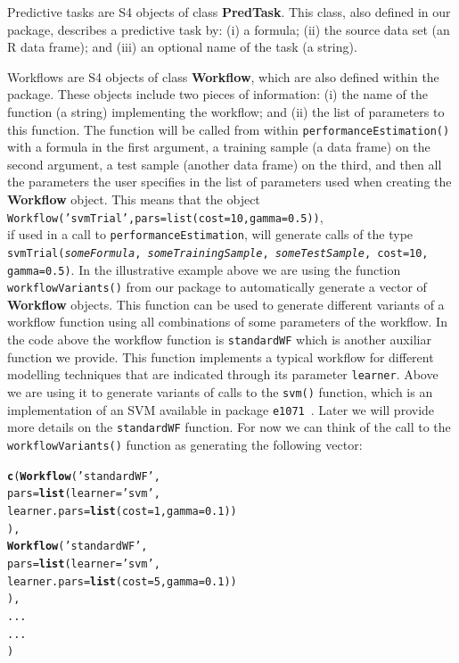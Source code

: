 \documentclass[10pt,a4paper]{article}\usepackage[]{graphicx}\usepackage[]{color}
\makeatletter
\newcommand{\hlstr}[1]{\textcolor[rgb]{0.192,0.494,0.8}{#1}}%
\newcommand{\hlkwd}[1]{\textcolor[rgb]{0.737,0.353,0.396}{\textbf{#1}}}%
\newenvironment{kframe}{%
 \def\at@end@of@kframe{}%
 \ifinner\ifhmode%
  \def\at@end@of@kframe{\end{minipage}}%
  \begin{minipage}{\columnwidth}%
 \fi\fi%
 \def\FrameCommand##1{\hskip\@totalleftmargin \hskip-\fboxsep
 \colorbox{shadecolor}{##1}\hskip-\fboxsep
     \hskip-\linewidth \hskip-\@totalleftmargin \hskip\columnwidth}%
 \MakeFramed {\advance\hsize-\width
   \@totalleftmargin\z@ \linewidth\hsize
   \@setminipage}}%
 {\par\unskip\endMakeFramed%
 \at@end@of@kframe}
\newenvironment{knitrout}{}{} %
\makeatother
\begin{document}
Predictive tasks are S4 objects of class
\textbf{PredTask}. This class, also defined in our package,
describes a predictive task by: (i) a formula; (ii) the source data
set (an R data frame); and (iii) an optional name of the task (a
string). 

Workflows are S4 objects of class \textbf{Workflow}, which are also
defined within the package. These objects include two pieces
of information: (i) the name of the function (a string) implementing the
workflow; and (ii) the list of parameters to this function. The
function will be called from within 
\texttt{performanceEstimation()}  with a formula in the first
argument, a training sample (a data frame) on the second argument, a
test sample (another data frame) on the third, and then all the parameters
the user specifies in the list of parameters used when creating the
\textbf{Workflow} object. This means that the object\\
\texttt{Workflow('svmTrial',pars=list(cost=10,gamma=0.5))},\\ if used in a
call to \texttt{performanceEstimation}, will 
 generate calls of the type
\texttt{svmTrial(\textit{someFormula}, \textit{someTrainingSample}, \textit{someTestSample}, cost=10,
  gamma=0.5)}. In the illustrative example above we are using the function \\ \texttt{workflowVariants()} from our package to automatically
generate a vector of \textbf{Workflow} objects. This function can be used
to generate different variants of a workflow function using all
combinations of some parameters of the workflow. In the code
above the workflow function is \texttt{standardWF} which is another
auxiliar function we provide. This function implements a typical
workflow for different modelling techniques that are indicated through
its parameter \texttt{learner}. Above we are using it to generate
variants of calls to the \texttt{svm()} function, which is an implementation of an SVM available in package \texttt{e1071}~\cite{e1071}.  Later we will provide
more details on the \texttt{standardWF} function. For now we can think of the call
to the \texttt{workflowVariants()} function as generating the following vector:\linebreak

\begin{knitrout}\small
{}\color{fgcolor}\begin{kframe}
\begin{alltt}
\hlkwd{c}(\hlkwd{Workflow}(\hlstr{'standardWF'},
          pars=\hlkwd{list}(learner=\hlstr{'svm'},
                    learner.pars=\hlkwd{list}(cost=1,gamma=0.1))
         ), 
  \hlkwd{Workflow}(\hlstr{'standardWF'},
          pars=\hlkwd{list}(learner=\hlstr{'svm'},
                    learner.pars=\hlkwd{list}(cost=5,gamma=0.1))
         ),
...
...
 ) 
\end{alltt}
\end{kframe}
\end{knitrout}
\end{document}
